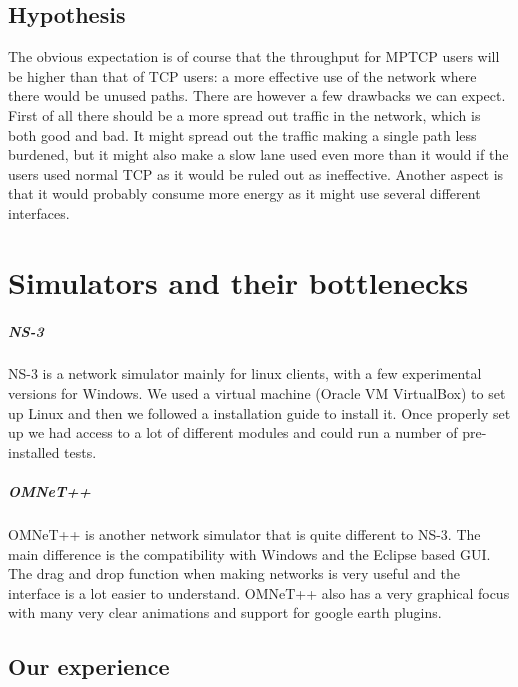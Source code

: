 \documentclass[11pt,twocolumn]{article}
\begin{document}
\subsection{Hypothesis}

The obvious expectation is of course that the throughput for MPTCP users will be higher than that of TCP users: a more effective use of the network where there would be unused paths. There are however a few drawbacks we can expect. First of all there should be a more spread out traffic in the network, which is both good and bad. It might spread out the traffic making a single path less burdened, but it might also make a slow lane used even more than it would if the users used normal TCP as it would be ruled out as ineffective. Another aspect is that it would probably consume more energy as it might use several different interfaces.



\section{Simulators and their bottlenecks}

\subparagraph{NS-3}

NS-3 is a network simulator mainly for linux clients, with a few experimental versions for Windows. We used a virtual machine (Oracle VM VirtualBox) to set up Linux and then we followed a installation guide\cite{Guide} to install it. Once properly set up we had access to a lot of different modules and could run a number of pre-installed tests. 

\subparagraph{OMNeT++}

OMNeT++ is another network simulator that is quite different to NS-3. The main difference is the compatibility with Windows and the Eclipse based GUI. The drag and drop function when making networks is very useful and the interface is a lot easier to understand. OMNeT++ also has a very graphical focus with many very clear animations and support for google earth plugins.

\subsection{Our experience}
\end{document}
